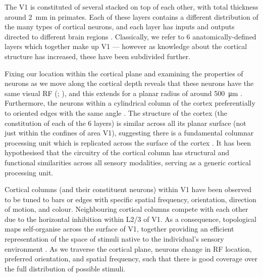 The \acf{V1} is constituted of several  stacked on top of each other, with total thickness around \SI{2}{\milli\metre} in primates.
Each of these layers contains a different distribution of the many types of cortical neurons, and each layer has inputs and outputs directed to different brain regions \citep{Harris2013}.
Classically, we refer to \num{6} anatomically-defined layers which together make up \ac{V1} --- however as knowledge about the cortical structure has increased, these have been subdivided further.

Fixing our location within the cortical plane and examining the properties of neurons as we move along the cortical depth reveals that these neurons have the same visual \ac{RF} (\citealp{Hubel1962}; \citealp{Hubel1963}), and this extends for a planar radius of around \SI{500}{\micro\metre} \citep{Mountcastle1997}.
Furthermore, the neurons within a cylindrical column of the cortex preferentially to oriented edges with the same angle \citep{Hubel1962}.
The structure of the cortex (the constitution of each of the \num{6} layers) is similar across all its planar surface (not just within the confines of area \ac{V1}), suggesting there is a fundamental columnar processing unit which is replicated across the surface of the cortex \citep{Mountcastle1957,Douglas1989,Douglas1991,Douglas2004,Binzegger2009}.
It has been hypothesised that the circuitry of the cortical column has structural and functional similarities across all sensory modalities, serving as a generic cortical processing unit.

Cortical columns (and their constituent neurons) within \ac{V1} have been observed to be tuned to bars or edges with specific spatial frequency, orientation, direction of motion, and colour.
Neighbouring cortical columns compete with each other due to the horizontal inhibition within \acs{L2/3} of \ac{V1}.
As a consequence, topological maps self-organise across the surface of \ac{V1}, together providing an efficient representation of the space of stimuli native to the individual's sensory environment \citep{Miikkulainen2005,Stevens2013,Wilson2015}.
As we traverse the cortical plane, neurons change in \ac{RF} location, preferred orientation, and spatial frequency, such that there is good coverage over the full distribution of possible stimuli.


